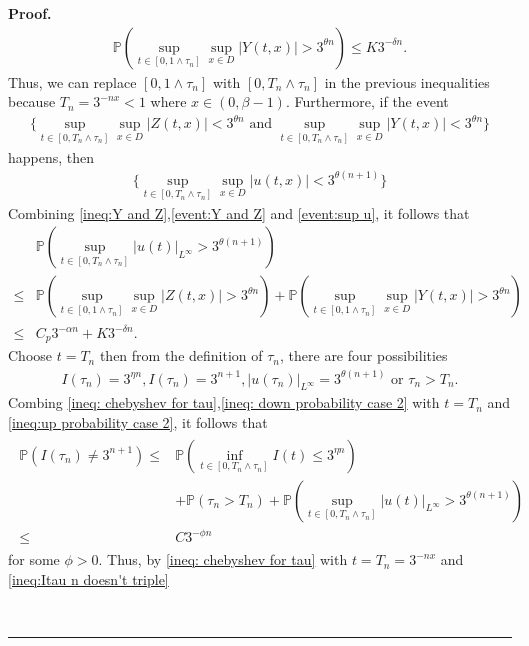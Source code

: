\documentclass[12pt]{article}
\newenvironment{proof}[1][Proof]{\noindent\textbf{#1.} }{\ \rule{0.5em}{0.5em}}
\numberwithin{equation}{section}
\begin{document}
\begin{proof}
\begin{align}
    \mathbb{P}(\sup_{t\in [0,1\land \tau_n]}\sup_{x\in D}|Y(t,x)|>3^{\theta n})\leq K3^{-\delta n}.\label{ineq:Y and Z}
\end{align}
Thus, we can replace $[0,1\land\tau_n]$ with $[0,T_n\land\tau_n]$ in the previous inequalities because $T_n=3^{-nx}<1$ where $x\in(0,\beta-1)$. Furthermore, if the event
\begin{align}
    \Big\{\sup_{t\in [0,T_n\land \tau_n]}\sup_{x\in D}|Z(t,x)|< 3^{\theta n}\text{ and }\sup_{t\in [0,T_n\land \tau_n]}\sup_{x\in D}|Y(t,x)|< 3^{\theta n}\Big\}\label{event:Y and Z}
\end{align}
happens, then 
\begin{align}
    \Big\{\sup_{t\in[0,T_n\land\tau_n]}\sup_{x\in D}|u(t,x)|<3^{\theta(n+1)}\Big\}\label{event:sup u}
\end{align}
Combining \eqref{ineq:Y and Z},\eqref{event:Y and Z} and \eqref{event:sup u}, it follows that
\begin{align}
    &\mathbb{P}(\sup_{t\in [0,T_n\land\tau_n]}|u(t)|_{L^\infty}>3^{\theta(n+1)})\nonumber\\
    \leq & \mathbb{P}(\sup_{t\in [0,1\land \tau_n]}\sup_{x\in D}|Z(t,x)|>3^{\theta n})+\mathbb{P}(\sup_{t\in [0,1\land \tau_n]}\sup_{x\in D}|Y(t,x)|>3^{\theta n})\nonumber\\
    \leq & C_p3^{-\alpha n}+K3^{-\delta n}.\label{ineq:up probability case 2} 
\end{align}
Choose $t=T_n$ then from the definition of $\tau_n$, there are four possibilities
\begin{align}
    I(\tau_n)=3^{\eta n}, I(\tau_n)=3^{n+1},|u(\tau_n)|_{L^\infty}=3^{\theta(n+1)}\text{ or }\tau_n>T_n.
\end{align}
Combing \eqref{ineq: chebyshev for tau},\eqref{ineq: down probability case 2} with $t=T_n$ and \eqref{ineq:up probability case 2}, it follows that
\begin{align}
    \begin{split}
        \mathbb{P}(I(\tau_n)\ne 3^{n+1})\leq &\mathbb{P}(\inf_{t\in [0,T_n\land\tau_n]}I(t)\leq 3^{\eta n})\\
        &+\mathbb{P}(\tau_n>T_n)+\mathbb{P}(\sup_{t\in [0,T_n\land\tau_n]}|u(t)|_{L^\infty}>3^{\theta(n+1)})\\
    \leq & C3^{-\phi n}
    \end{split}\label{ineq:Itau n doesn't triple}
\end{align}
for some $\phi>0$. Thus, by \eqref{ineq: chebyshev for tau} with $t=T_n=3^{-nx}$ and \eqref{ineq:Itau n doesn't triple}

\end{proof}
\end{document}
